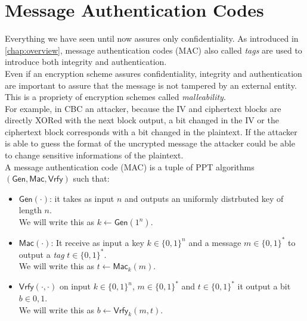 \section{Message Authentication Codes}\label{sec:mac}
Everything we have seen until now assures only confidentiality. As introduced in \autoref{chap:overview}, message authentication codes (MAC) also called \emph{tags} are used to introduce both integrity and authentication.\\
Even if an encryption scheme assures confidentiality, integrity and authentication are important to assure that the message is not tampered by an external entity. This is a propriety of encryption schemes called \emph{malleability}.\\
For example, in CBC an attacker, because the IV and ciphertext blocks are directly XORed with the next block output, a bit changed in the IV or the ciphertext block corresponds with a bit changed in the plaintext. If the attacker is able to guess the format of the uncrypted message the attacker could be able to change sensitive informations of the plaintext.\\
A message authentication code (MAC) is a tuple of PPT algorithms $(\mathsf{Gen},\mathsf{Mac},\mathsf{Vrfy})$ such that:
\begin{itemize}
    \item{$\mathsf{Gen(\cdot)}$: it takes as input $n$ and outputs an uniformly distrbuted key of length $n$.\\We will write this as $k \leftarrow \mathsf{Gen}(1^n)$.}
    \item{$\mathsf{Mac(\cdot)}$: It receive as input a key $k \in \{0,1\}^n$ and a message $m \in \{0,1\}^{*}$ to output a \emph{tag} $t \in \{0,1\}^{*}$.\\We will write this as $t \leftarrow \mathsf{Mac}_k(m)$.}
    \item{$\mathsf{Vrfy(\cdot,\cdot)}$ on input $k \in \{0,1\}^n$, $m \in \{0,1\}^{*}$ and $t \in \{0,1\}^{*}$ it output a bit $b \in {0,1}$.\\We will write this as $b \leftarrow \mathsf{Vrfy}_k(m, t)$.}
\end{itemize}
